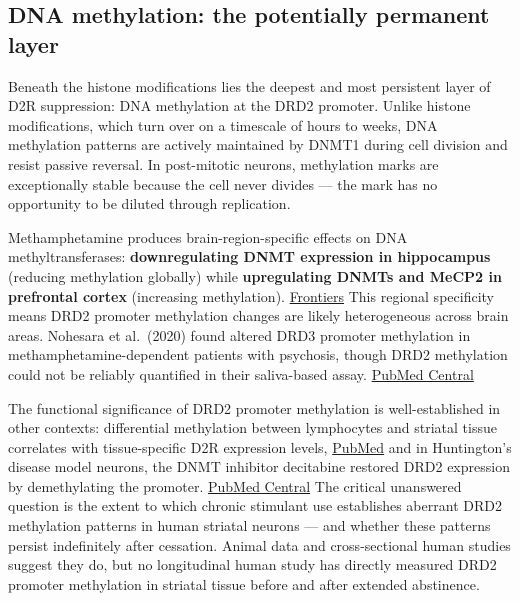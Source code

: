 \subsection{DNA methylation: the potentially permanent layer}\label{15_d2_downregulation-dna-methylation-the-potentially-permanent-layer}

Beneath the histone modifications lies the deepest and most persistent layer of D2R suppression: DNA methylation at the DRD2 promoter. Unlike histone modifications, which turn over on a timescale of hours to weeks, DNA methylation patterns are actively maintained by DNMT1 during cell division and resist passive reversal. In post-mitotic neurons, methylation marks are exceptionally stable because the cell never divides --- the mark has no opportunity to be diluted through replication.

Methamphetamine produces brain-region-specific effects on DNA methyltransferases: \textbf{downregulating DNMT expression in hippocampus} (reducing methylation globally) while \textbf{upregulating DNMTs and MeCP2 in prefrontal cortex} (increasing methylation). \href{https://www.frontiersin.org/journals/pharmacology/articles/10.3389/fphar.2022.984997/full}{Frontiers} This regional specificity means DRD2 promoter methylation changes are likely heterogeneous across brain areas. Nohesara et al.~(2020) found altered DRD3 promoter methylation in methamphetamine-dependent patients with psychosis, though DRD2 methylation could not be reliably quantified in their saliva-based assay. \href{https://pmc.ncbi.nlm.nih.gov/articles/PMC7115129/}{PubMed Central}

The functional significance of DRD2 promoter methylation is well-established in other contexts: differential methylation between lymphocytes and striatal tissue correlates with tissue-specific D2R expression levels, \href{https://pubmed.ncbi.nlm.nih.gov/10363934/}{PubMed} and in Huntington's disease model neurons, the DNMT inhibitor decitabine restored DRD2 expression by demethylating the promoter. \href{https://pmc.ncbi.nlm.nih.gov/articles/PMC4981892/}{PubMed Central} The critical unanswered question is the extent to which chronic stimulant use establishes aberrant DRD2 methylation patterns in human striatal neurons --- and whether these patterns persist indefinitely after cessation. Animal data and cross-sectional human studies suggest they do, but no longitudinal human study has directly measured DRD2 promoter methylation in striatal tissue before and after extended abstinence.

